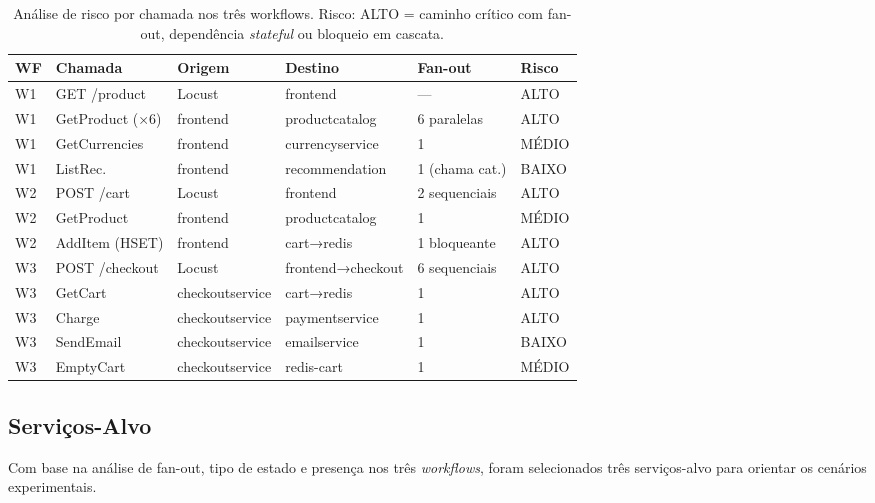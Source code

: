 \documentclass[manuscript,oneside]{acmart}
\begin{document}
\begin{table}[H]
\caption{Análise de risco por chamada nos três workflows. Risco: ALTO = caminho crítico com fan-out, dependência \textit{stateful} ou bloqueio em cascata.}
\label{tab:risco}
\begin{tabular}{llllll}
\toprule
\textbf{WF} & \textbf{Chamada} & \textbf{Origem} & \textbf{Destino} & \textbf{Fan-out} & \textbf{Risco} \\
\midrule
W1 & GET /product     & Locust          & frontend          & —                & ALTO \\
W1 & GetProduct (×6)  & frontend        & productcatalog    & 6 paralelas      & ALTO \\
W1 & GetCurrencies    & frontend        & currencyservice   & 1                & MÉDIO \\
W1 & ListRec.         & frontend        & recommendation    & 1 (chama cat.)   & BAIXO \\
W2 & POST /cart       & Locust          & frontend          & 2 sequenciais    & ALTO \\
W2 & GetProduct       & frontend        & productcatalog    & 1                & MÉDIO \\
W2 & AddItem (HSET)   & frontend        & cart→redis        & 1 bloqueante     & ALTO \\
W3 & POST /checkout   & Locust          & frontend→checkout & 6 sequenciais    & ALTO \\
W3 & GetCart          & checkoutservice & cart→redis        & 1                & ALTO \\
W3 & Charge           & checkoutservice & paymentservice    & 1                & ALTO \\
W3 & SendEmail        & checkoutservice & emailservice      & 1                & BAIXO \\
W3 & EmptyCart        & checkoutservice & redis-cart        & 1                & MÉDIO \\
\bottomrule
\end{tabular}
\end{table}

\subsection{Serviços-Alvo}

Com base na análise de fan-out, tipo de estado e presença nos três \textit{workflows}, foram selecionados três serviços-alvo para orientar os cenários experimentais.
\end{document}
